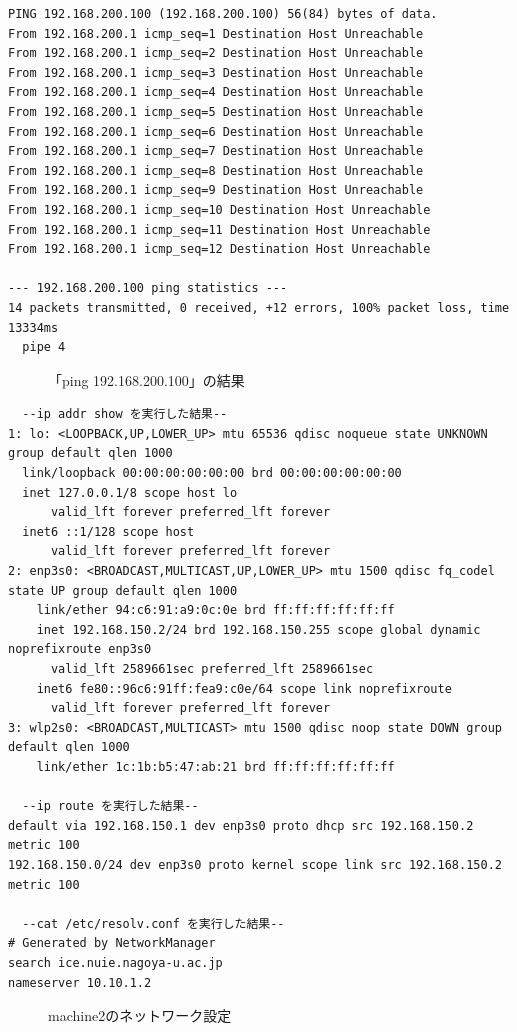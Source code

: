 \documentclass{ltjsarticle} %
\begin{document}
\begin{mdframed}
  \begin{verbatim}
PING 192.168.200.100 (192.168.200.100) 56(84) bytes of data.
From 192.168.200.1 icmp_seq=1 Destination Host Unreachable
From 192.168.200.1 icmp_seq=2 Destination Host Unreachable
From 192.168.200.1 icmp_seq=3 Destination Host Unreachable
From 192.168.200.1 icmp_seq=4 Destination Host Unreachable
From 192.168.200.1 icmp_seq=5 Destination Host Unreachable
From 192.168.200.1 icmp_seq=6 Destination Host Unreachable
From 192.168.200.1 icmp_seq=7 Destination Host Unreachable
From 192.168.200.1 icmp_seq=8 Destination Host Unreachable
From 192.168.200.1 icmp_seq=9 Destination Host Unreachable
From 192.168.200.1 icmp_seq=10 Destination Host Unreachable
From 192.168.200.1 icmp_seq=11 Destination Host Unreachable
From 192.168.200.1 icmp_seq=12 Destination Host Unreachable

--- 192.168.200.100 ping statistics ---
14 packets transmitted, 0 received, +12 errors, 100% packet loss, time 13334ms
  pipe 4
  \end{verbatim}
  \end{mdframed}
  \begin{figure}[H]
  \caption{「ping 192.168.200.100」の結果}
  \label{fig:ping3}
\end{figure}

\begin{mdframed}
  \begin{verbatim}
  --ip addr show を実行した結果--
1: lo: <LOOPBACK,UP,LOWER_UP> mtu 65536 qdisc noqueue state UNKNOWN group default qlen 1000
  link/loopback 00:00:00:00:00:00 brd 00:00:00:00:00:00
  inet 127.0.0.1/8 scope host lo
      valid_lft forever preferred_lft forever
  inet6 ::1/128 scope host
      valid_lft forever preferred_lft forever
2: enp3s0: <BROADCAST,MULTICAST,UP,LOWER_UP> mtu 1500 qdisc fq_codel state UP group default qlen 1000
    link/ether 94:c6:91:a9:0c:0e brd ff:ff:ff:ff:ff:ff
    inet 192.168.150.2/24 brd 192.168.150.255 scope global dynamic noprefixroute enp3s0
      valid_lft 2589661sec preferred_lft 2589661sec
    inet6 fe80::96c6:91ff:fea9:c0e/64 scope link noprefixroute
      valid_lft forever preferred_lft forever
3: wlp2s0: <BROADCAST,MULTICAST> mtu 1500 qdisc noop state DOWN group default qlen 1000
    link/ether 1c:1b:b5:47:ab:21 brd ff:ff:ff:ff:ff:ff

  --ip route を実行した結果--
default via 192.168.150.1 dev enp3s0 proto dhcp src 192.168.150.2 metric 100
192.168.150.0/24 dev enp3s0 proto kernel scope link src 192.168.150.2 metric 100

  --cat /etc/resolv.conf を実行した結果--
# Generated by NetworkManager
search ice.nuie.nagoya-u.ac.jp
nameserver 10.10.1.2
  \end{verbatim}
  \end{mdframed}
  \begin{figure}[H]
  \caption{machine2のネットワーク設定}
  \label{fig:machine2}
\end{figure}
\end{document}
